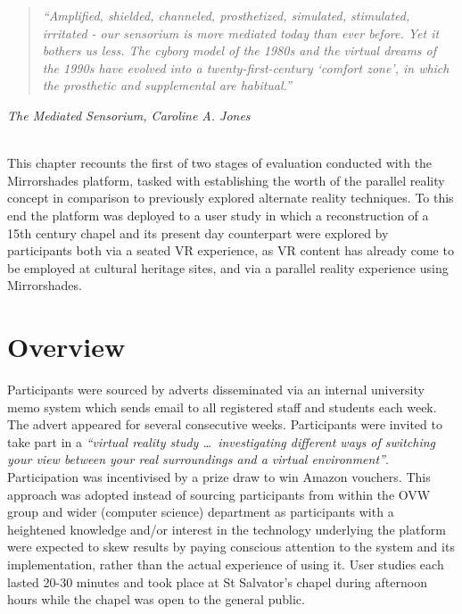 \begin{quote}
	\textit{``Amplified, shielded, channeled, prosthetized, simulated, stimulated, irritated - our sensorium is more mediated today than ever before. Yet it bothers us less. The cyborg model of the 1980s and the virtual dreams of the 1990s have evolved into a twenty-first-century `comfort zone', in which the prosthetic and supplemental are habitual.''}
\end{quote}
\hfill \textit{The Mediated Sensorium, Caroline A. Jones}
\\
\\


\label{chapter-eval-1}

This chapter recounts the first of two stages of evaluation conducted with the Mirrorshades platform, tasked with establishing the worth of the parallel reality concept in comparison to previously explored alternate reality techniques. To this end the platform was deployed to a user study in which a reconstruction of a 15th century chapel and its present day counterpart were explored by participants both via a seated VR experience, as VR content has already come to be employed at cultural heritage sites, and via a parallel reality experience using Mirrorshades.




\section{Overview}



Participants were sourced by adverts disseminated via an internal university memo system which sends email to all registered staff and students each week. The advert appeared for several consecutive weeks. Participants were invited to take part in a \textit{``virtual reality study \ldots\ investigating different ways of switching your view between your real surroundings and a virtual environment''}. Participation was incentivised by a prize draw to win Amazon vouchers. This approach was adopted instead of sourcing participants from within the OVW group and wider (computer science) department as participants with a heightened knowledge and/or interest in the technology underlying the platform were expected to skew results by paying conscious attention to the system and its implementation, rather than the actual experience of using it. User studies each lasted 20-30 minutes and took place at St Salvator's chapel during afternoon hours while the chapel was open to the general public.

